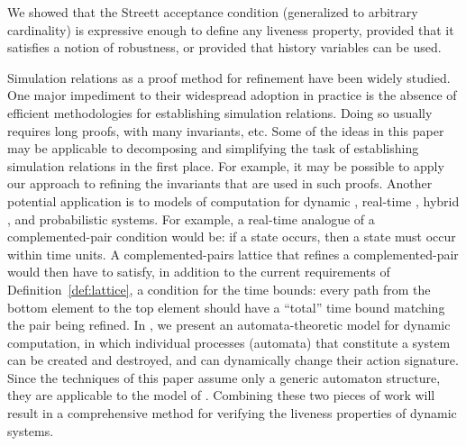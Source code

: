 \documentclass[11pt]{article}
\begin{document}
We showed that the Streett acceptance condition (generalized to
arbitrary cardinality) is expressive enough to define any liveness
property, provided that it satisfies a notion of robustness, or
provided that history variables can be used.  

Simulation relations as a proof method for refinement have been widely
studied. One major impediment to their widespread adoption in practice
is the absence of efficient methodologies for establishing simulation
relations. Doing so usually requires long proofs, with many invariants,
etc. Some of the ideas in this paper may be applicable to
decomposing and simplifying the task of establishing simulation
relations in the first place. For example, it may be possible to apply
our approach to refining the invariants that are used in such
proofs. Another potential application is to models of computation for
dynamic \cite{ALy01}, real-time \cite{LSVK03}, hybrid \cite{LSV03}, and
probabilistic \cite{S95}  systems.
For example, a real-time analogue of a complemented-pair condition
would be: if a  state occurs, then a  state must occur
within  time units. A complemented-pairs lattice that refines a
complemented-pair would then have to satisfy, in addition to the
current requirements of Definition~\ref{def:lattice}, a condition for
the time bounds: every path from the bottom element to the top element
should have a ``total'' time bound matching the pair being refined.
In \cite{ALy01}, we present an automata-theoretic model for dynamic
computation, in which individual processes (automata) that constitute
a system can be created and destroyed, and can dynamically change
their action signature. Since the techniques of this paper assume only
a generic automaton structure, they are applicable to the model of 
\cite{ALy01}. Combining these two pieces of work will result in a
comprehensive method for verifying the liveness properties of
dynamic systems.











\clearpage


\end{document}
